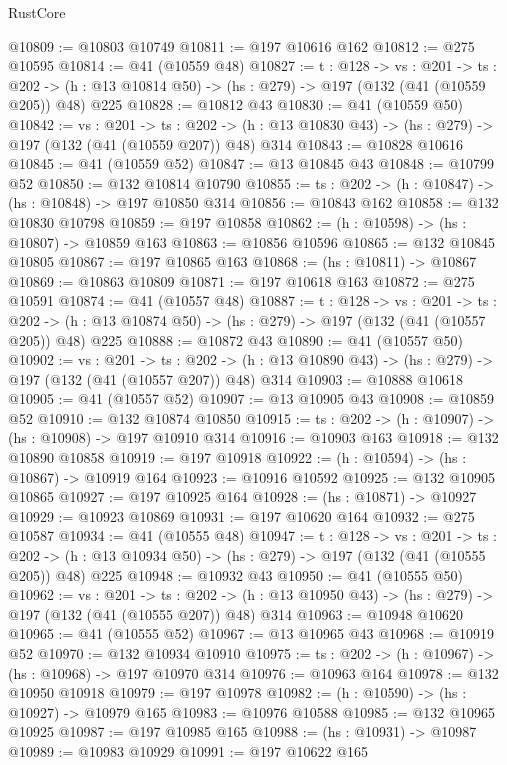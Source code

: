 \begin{lexlean}{RustCore}
\begin{coremodule}
@10809 := @10803 @10749
@10811 := @197 @10616 @162
@10812 := @275 @10595
@10814 := @41 (@10559 @48)
@10827 := {t : @128} ->
  {vs : @201} ->
  {ts : @202} -> (h : @13 @10814 @50) -> (hs : @279) -> @197 (@132 (@41 (@10559 @205)) @48) @225
@10828 := @10812 @43
@10830 := @41 (@10559 @50)
@10842 := {vs : @201} ->
  {ts : @202} -> (h : @13 @10830 @43) -> (hs : @279) -> @197 (@132 (@41 (@10559 @207)) @48) @314
@10843 := @10828 @10616
@10845 := @41 (@10559 @52)
@10847 := @13 @10845 @43
@10848 := @10799 @52
@10850 := @132 @10814 @10790
@10855 := {ts : @202} -> (h : @10847) -> (hs : @10848) -> @197 @10850 @314
@10856 := @10843 @162
@10858 := @132 @10830 @10798
@10859 := @197 @10858
@10862 := (h : @10598) -> (hs : @10807) -> @10859 @163
@10863 := @10856 @10596
@10865 := @132 @10845 @10805
@10867 := @197 @10865 @163
@10868 := (hs : @10811) -> @10867
@10869 := @10863 @10809
@10871 := @197 @10618 @163
@10872 := @275 @10591
@10874 := @41 (@10557 @48)
@10887 := {t : @128} ->
  {vs : @201} ->
  {ts : @202} -> (h : @13 @10874 @50) -> (hs : @279) -> @197 (@132 (@41 (@10557 @205)) @48) @225
@10888 := @10872 @43
@10890 := @41 (@10557 @50)
@10902 := {vs : @201} ->
  {ts : @202} -> (h : @13 @10890 @43) -> (hs : @279) -> @197 (@132 (@41 (@10557 @207)) @48) @314
@10903 := @10888 @10618
@10905 := @41 (@10557 @52)
@10907 := @13 @10905 @43
@10908 := @10859 @52
@10910 := @132 @10874 @10850
@10915 := {ts : @202} -> (h : @10907) -> (hs : @10908) -> @197 @10910 @314
@10916 := @10903 @163
@10918 := @132 @10890 @10858
@10919 := @197 @10918
@10922 := (h : @10594) -> (hs : @10867) -> @10919 @164
@10923 := @10916 @10592
@10925 := @132 @10905 @10865
@10927 := @197 @10925 @164
@10928 := (hs : @10871) -> @10927
@10929 := @10923 @10869
@10931 := @197 @10620 @164
@10932 := @275 @10587
@10934 := @41 (@10555 @48)
@10947 := {t : @128} ->
  {vs : @201} ->
  {ts : @202} -> (h : @13 @10934 @50) -> (hs : @279) -> @197 (@132 (@41 (@10555 @205)) @48) @225
@10948 := @10932 @43
@10950 := @41 (@10555 @50)
@10962 := {vs : @201} ->
  {ts : @202} -> (h : @13 @10950 @43) -> (hs : @279) -> @197 (@132 (@41 (@10555 @207)) @48) @314
@10963 := @10948 @10620
@10965 := @41 (@10555 @52)
@10967 := @13 @10965 @43
@10968 := @10919 @52
@10970 := @132 @10934 @10910
@10975 := {ts : @202} -> (h : @10967) -> (hs : @10968) -> @197 @10970 @314
@10976 := @10963 @164
@10978 := @132 @10950 @10918
@10979 := @197 @10978
@10982 := (h : @10590) -> (hs : @10927) -> @10979 @165
@10983 := @10976 @10588
@10985 := @132 @10965 @10925
@10987 := @197 @10985 @165
@10988 := (hs : @10931) -> @10987
@10989 := @10983 @10929
@10991 := @197 @10622 @165

\end{coremodule}
\end{lexlean}
